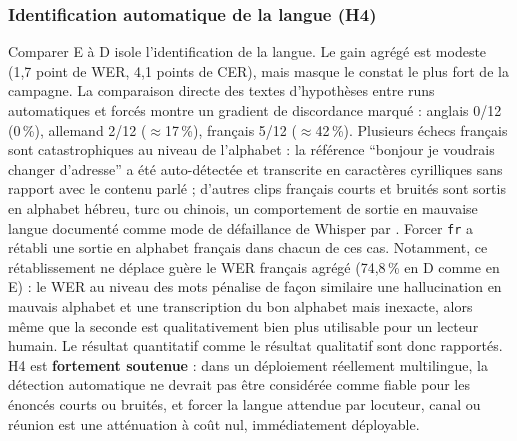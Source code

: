 \documentclass[12pt]{report}
\begin{document}
\subsubsection{Identification automatique de la langue (H4)}
Comparer E à D isole l'identification de la langue. Le gain agrégé est modeste (1,7 point de WER, 4,1 points de CER), mais masque le constat le plus fort de la campagne. La comparaison directe des textes d'hypothèses entre runs automatiques et forcés montre un gradient de discordance marqué : anglais 0/12 (0\,\%), allemand 2/12 ($\approx$17\,\%), français 5/12 ($\approx$42\,\%). Plusieurs échecs français sont catastrophiques au niveau de l'alphabet : la référence \enquote{bonjour je voudrais changer d'adresse} a été auto-détectée et transcrite en caractères cyrilliques sans rapport avec le contenu parlé ; d'autres clips français courts et bruités sont sortis en alphabet hébreu, turc ou chinois, un comportement de sortie en mauvaise langue documenté comme mode de défaillance de Whisper par \cite{koenecke2024careless}. Forcer \texttt{fr} a rétabli une sortie en alphabet français dans chacun de ces cas. Notamment, ce rétablissement ne déplace guère le WER français agrégé (74,8\,\% en D comme en E) : le WER au niveau des mots pénalise de façon similaire une hallucination en mauvais alphabet et une transcription du bon alphabet mais inexacte, alors même que la seconde est qualitativement bien plus utilisable pour un lecteur humain. Le résultat quantitatif comme le résultat qualitatif sont donc rapportés. H4 est \textbf{fortement soutenue} : dans un déploiement réellement multilingue, la détection automatique ne devrait pas être considérée comme fiable pour les énoncés courts ou bruités, et forcer la langue attendue par locuteur, canal ou réunion est une atténuation à coût nul, immédiatement déployable.
\end{document}

